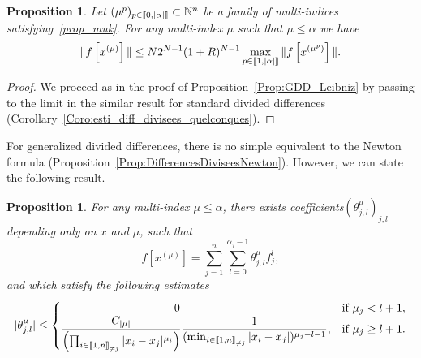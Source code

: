\documentclass[11pt]{article}
\newtheorem{prop}[theo]{Proposition}
\theoremstyle{definition}
\numberwithin{equation}{section}
\numberwithin{figure}{section}
\numberwithin{table}{section}
\newcommand{\llbracket}{\mathopen{[\mkern -2.7mu[}}
\newcommand{\rrbracket}{\mathclose{]\mkern -2.7mu]}}
\newcommand{\inter}[2]{\llbracket #1,#2 \rrbracket}
\newcommand{\interexclu}[3]{\llbracket #1,#2\rrbracket_{\neq #3}}
\newcommand{\N}{\mathbb{N}}
\begin{document}
\begin{prop}\label{Prop:Diagonale_GDD}
Let $(\mu^p)_{p\in \inter{0}{|\alpha|}} \subset \N^n $ be a family of multi-indices satisfying~\eqref{prop_muk}. For any multi-index $\mu$ such that $\mu\leq \alpha$ we have
\[
\| f\left[x^{(\mu)}\right] \| \leq N 2^{N-1} (1+R)^{N-1} \max_{p\in \inter{1}{|\alpha|}} \|f\left[x^{(\mu^p)}\right]\|.
\]
\end{prop}

\begin{proof}
We proceed as in the proof of Proposition~\ref{Prop:GDD_Leibniz} by passing to the limit in the similar result for standard divided differences (Corollary~\ref{Coro:esti_diff_divisees_quelconques}).
\end{proof}

For generalized divided differences, there is no simple equivalent to the Newton formula (Proposition~\ref{Prop:DifferencesDiviseesNewton}). However, we can state the following result.

\begin{prop}\label{Prop:NewtonGDD}
For any multi-index $\mu\leq \alpha$, there exists coefficients\linebreak$(\theta^\mu_{j,l})_{j,l}$ depending only on $x$ and $\mu$, such that
\[
f[x^{(\mu)}] = \sum_{j=1}^n \sum_{l=0}^{\alpha_j-1} \theta^\mu_{j,l} f_j^l,
\]
and which satisfy the following estimates
\[
|\theta^\mu_{j,l}| \leq
\begin{cases}
\mkern180mu 0 & \text{if }\mu_j<l+1,\\
\displaystyle \frac{C_{|\mu|}}{\left(\prod_{i\in\interexclu{1}{n}{j}} |x_i-x_j|^{\mu_i}\right)} \frac{1}{(\min_{i\in\interexclu{1}{n}{j}} |x_i-x_j|)^{\mu_j-l-1}}, & \text{if }\mu_j\geq l+1.
\end{cases}
\]
\end{prop}
\end{document}
